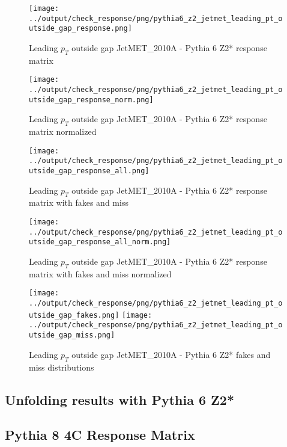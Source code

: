 \documentclass[11pt]{book}
\begin{document}
\begin{figure}[ht]
\centering
\texttt{[image: ../output/check\_response/png/pythia6\_z2\_jetmet\_leading\_pt\_outside\_gap\_response.png]}
\caption{Leading $p_{T}$ outside gap JetMET\_2010A - Pythia 6 Z2* response matrix}
\label{p6_jetmet_leading_pt_outside_gap_response}
\end{figure}

\begin{figure}[ht]
\centering
\texttt{[image: ../output/check\_response/png/pythia6\_z2\_jetmet\_leading\_pt\_outside\_gap\_response\_norm.png]}
\caption{Leading $p_{T}$ outside gap JetMET\_2010A - Pythia 6 Z2* response matrix normalized}
\label{p6_jetmet_leading_pt_outside_gap_response_norm}
\end{figure}

\begin{figure}[ht]
\centering
\texttt{[image: ../output/check\_response/png/pythia6\_z2\_jetmet\_leading\_pt\_outside\_gap\_response\_all.png]}
\caption{Leading $p_{T}$ outside gap JetMET\_2010A - Pythia 6 Z2* response matrix with fakes and miss}
\label{p6_jetmet_leading_pt_outside_gap_response_all}
\end{figure}

\begin{figure}[ht]
\centering
\texttt{[image: ../output/check\_response/png/pythia6\_z2\_jetmet\_leading\_pt\_outside\_gap\_response\_all\_norm.png]}
\caption{Leading $p_{T}$ outside gap JetMET\_2010A - Pythia 6 Z2* response matrix with fakes and miss normalized}
\label{p6_jetmet_leading_pt_outside_gap_response_all_norm}
\end{figure}

\begin{figure}[ht]
\centering
\texttt{[image: ../output/check\_response/png/pythia6\_z2\_jetmet\_leading\_pt\_outside\_gap\_fakes.png]}
\texttt{[image: ../output/check\_response/png/pythia6\_z2\_jetmet\_leading\_pt\_outside\_gap\_miss.png]}
\caption{Leading $p_{T}$ outside gap JetMET\_2010A - Pythia 6 Z2* fakes and miss distributions}
\label{p6_jetmet_leading_pt_outside_gap_fakesmiss}
\end{figure}


\clearpage
\subsection{Unfolding results with Pythia 6 Z2*}


\clearpage
\subsection{Pythia 8 4C Response Matrix}
\end{document}
